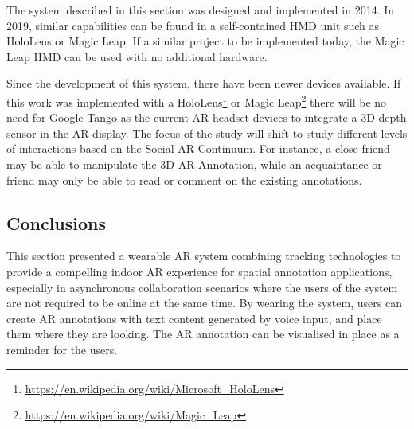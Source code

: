 The system described in this section was designed and implemented in 2014. In 2019, similar capabilities can be found in a self-contained HMD unit such as HoloLens or Magic Leap. If a similar project to be implemented today, the Magic Leap HMD can be used with no additional hardware.

Since the development of this system, there have been newer devices available. If this work was implemented with a HoloLens\footnote{\url{https://en.wikipedia.org/wiki/Microsoft_HoloLens}} or Magic Leap\footnote{\url{https://en.wikipedia.org/wiki/Magic_Leap}} there will be no need for Google Tango as the current AR headset devices to integrate a 3D depth sensor in the AR display. The focus of the study will shift to study different levels of interactions based on the Social AR Continuum. For instance, a close friend may be able to manipulate the 3D AR Annotation, while an acquaintance or friend may only be able to read or comment on the existing annotations. 

\subsection{Conclusions}

This section presented a wearable AR system combining tracking technologies to provide a compelling indoor AR experience for spatial annotation applications, especially in asynchronous collaboration scenarios where the users of the system are not required to be online at the same time. By wearing the system, users can create AR annotations with text content generated by voice input, and place them where they are looking. The AR annotation can be visualised in place as a reminder for the users.  

